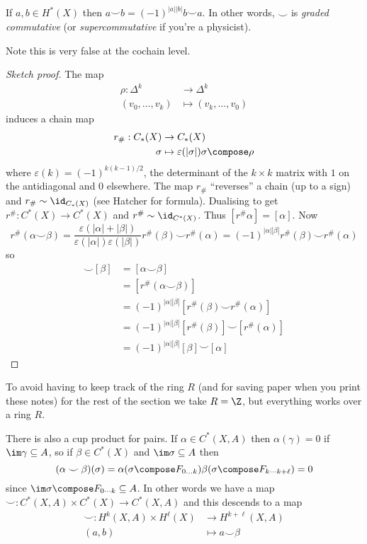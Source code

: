 \documentclass[a4paper]{article}
\newcommand*{\cp}{\smile} %
\begin{document}
\begin{proposition}
  If \(a, b \in H^*(X)\) then \(a \cp b = (-1)^{|a||b|} b \cp a\). In other words, \(\cp\) is \emph{graded commutative} (or \emph{supercommutative} if you're a physicist).
\end{proposition}

Note this is very false at the cochain level.

\begin{proof}[Sketch proof]
  The map
  \begin{align*}
    \rho: \Delta^k &\to \Delta^k \\
    (v_0,\dots, v_k) &\mapsto (v_k, \dots, v_0)
  \end{align*}
  induces a chain map
  \begin{align*}
    r_\#: C_*(X) &\to C_*(X) \\
    \sigma &\mapsto \varepsilon(|\sigma|) \sigma \compose \rho
  \end{align*}
  where \(\varepsilon(k) = (-1)^{k(k - 1)/2}\), the determinant of the \(k \times k\) matrix with \(1\) on the antidiagonal and \(0\) elsewhere. The map \(r_\#\) ``reverses'' a chain (up to a sign) and \(r_\# \sim \id_{C_*(X)}\) (see Hatcher for formula). Dualising to get \(r^\#: C^*(X) \to C^*(X)\) and \(r^\# \sim \id_{C^*(X)}\). Thus \([r^\# \alpha] = [\alpha]\). Now
  \[
    r^\#(\alpha \cp \beta)
    = \frac{\varepsilon(|\alpha| + |\beta|)}{\varepsilon(|\alpha|) \varepsilon(|\beta|)} r^\#(\beta) \cp r^\#(\alpha)
    = (-1)^{|\alpha||\beta|} r^\#(\beta) \cp r^\#(\alpha)
  \]
  so
  \begin{align*}
    [\alpha] \cp [\beta]
    &= [\alpha \cp \beta] \\
    &= [r^\#(\alpha \cp \beta)] \\
    &= (-1)^{|\alpha||\beta|} [r^\#(\beta) \cp r^\#(\alpha)] \\
    &= (-1)^{|\alpha||\beta|} [r^\#(\beta)] \cp [r^\#(\alpha)] \\
    &= (-1)^{|\alpha||\beta|} [\beta] \cp [\alpha]
  \end{align*}
\end{proof}

To avoid having to keep track of the ring \(R\) (and for saving paper when you print these notes) for the rest of the section we take \(R = \Z\), but everything works over a ring \(R\).

There is also a cup product for pairs. If \(\alpha \in C^*(X, A)\) then \(\alpha(\gamma) = 0\) if \(\im \gamma \subseteq A\), so if \(\beta \in C^*(X)\) and \(\im \sigma \subseteq A\) then
\[
  (\alpha \cp \beta)(\sigma) = \alpha(\sigma \compose F_{0 \dots k}) \beta(\sigma \compose F_{k \cdots k + \ell}) = 0
\]
since \(\im \sigma \compose F_{0 \cdots k} \subseteq A\). In other words we have a map \(\cp: C^*(X, A) \times C^*(X) \to C^*(X, A)\) and this descends to a map
\begin{align*}
  \cp: H^k(X, A) \times H^\ell(X) &\to H^{k + \ell}(X, A) \\
  (a, b) &\mapsto a \cp \beta
\end{align*}
\end{document}
